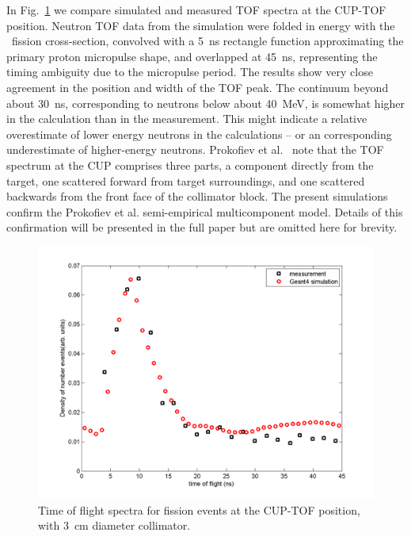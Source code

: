 \documentclass[peerreviewca,11pt,a4paper]{IEEEtran}
\let\MYoriglatexcaption\caption
\renewcommand{\caption}[2][\relax]{\MYoriglatexcaption[#2]{#2}}
\def\U238{\BPChem{\^{238}U}}
\begin{document}
In Fig.~\ref{fig:TOFSpectra} we compare simulated and measured TOF spectra at the CUP-TOF position.
Neutron TOF data from the simulation were folded in energy with the \U238\ fission cross-section, convolved with a \SI{5}{\ns} rectangle function approximating the primary proton micropulse shape, and overlapped at \SI{45}{\ns}, representing the timing ambiguity due to the micropulse period.
The results show very close agreement in the position and width of the TOF peak.
The continuum beyond about \SI{30}{\ns}, corresponding to neutrons below about \SI{40}{\MeV}, is somewhat higher in the calculation than in the measurement.
This might indicate a relative overestimate of lower energy neutrons in the calculations -- or an corresponding underestimate of higher-energy neutrons.
Prokofiev et al.~\cite{Prokofiev2014} note that the TOF spectrum at the CUP comprises three parts, a component directly from the target, one scattered forward from target surroundings, and one scattered backwards from the front face of the collimator block.
The present simulations confirm the Prokofiev et al. semi-empirical multicomponent model. Details of this confirmation will be presented in the full paper but are omitted here for brevity.

\begin{figure}[t]
    \centering
    \includegraphics[width=0.9\columnwidth]{CUPTOFtofspectraRADECS.png}
    \caption{
        Time of flight spectra for \U238 fission events at the CUP-TOF position, with \SI{3}{\cm} diameter collimator.
        }
    \label{fig:TOFSpectra}
\end{figure}
\end{document}
